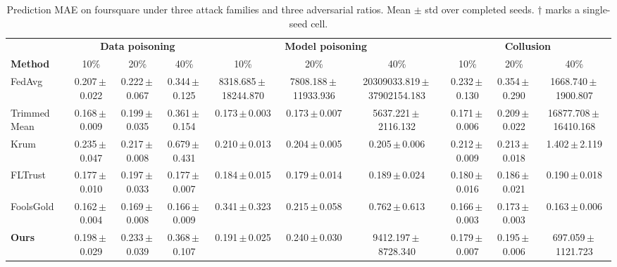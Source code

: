 \begin{table}[t]
\centering
\scriptsize
\caption{Prediction MAE on foursquare under three attack families and three adversarial ratios. Mean $\pm$ std over completed seeds. $\dagger$ marks a single-seed cell.}
\label{tab:main_results}
\begin{tabular}{lccccccccc}
\toprule
& \multicolumn{3}{c}{\textbf{Data poisoning}}& \multicolumn{3}{c}{\textbf{Model poisoning}}& \multicolumn{3}{c}{\textbf{Collusion}} \\
\cmidrule(lr){2-4}\cmidrule(lr){5-7}\cmidrule(lr){8-10}
\textbf{Method} & 10\% & 20\% & 40\% & 10\% & 20\% & 40\% & 10\% & 20\% & 40\% \\
\midrule
FedAvg & 0.207\,$\pm$\,0.022 & 0.222\,$\pm$\,0.067 & 0.344\,$\pm$\,0.125 & 8318.685\,$\pm$\,18244.870 & 7808.188\,$\pm$\,11933.936 & 20309033.819\,$\pm$\,37902154.183 & 0.232\,$\pm$\,0.130 & 0.354\,$\pm$\,0.290 & 1668.740\,$\pm$\,1900.807 \\
Trimmed Mean & 0.168\,$\pm$\,0.009 & 0.199\,$\pm$\,0.035 & 0.361\,$\pm$\,0.154 & 0.173\,$\pm$\,0.003 & 0.173\,$\pm$\,0.007 & 5637.221\,$\pm$\,2116.132 & 0.171\,$\pm$\,0.006 & 0.209\,$\pm$\,0.022 & 16877.708\,$\pm$\,16410.168 \\
Krum & 0.235\,$\pm$\,0.047 & 0.217\,$\pm$\,0.008 & 0.679\,$\pm$\,0.431 & 0.210\,$\pm$\,0.013 & 0.204\,$\pm$\,0.005 & 0.205\,$\pm$\,0.006 & 0.212\,$\pm$\,0.009 & 0.213\,$\pm$\,0.018 & 1.402\,$\pm$\,2.119 \\
FLTrust & 0.177\,$\pm$\,0.010 & 0.197\,$\pm$\,0.033 & 0.177\,$\pm$\,0.007 & 0.184\,$\pm$\,0.015 & 0.179\,$\pm$\,0.014 & 0.189\,$\pm$\,0.024 & 0.180\,$\pm$\,0.016 & 0.186\,$\pm$\,0.021 & 0.190\,$\pm$\,0.018 \\
FoolsGold & 0.162\,$\pm$\,0.004 & 0.169\,$\pm$\,0.008 & 0.166\,$\pm$\,0.009 & 0.341\,$\pm$\,0.323 & 0.215\,$\pm$\,0.058 & 0.762\,$\pm$\,0.613 & 0.166\,$\pm$\,0.003 & 0.173\,$\pm$\,0.003 & 0.163\,$\pm$\,0.006 \\
\textbf{Ours} & 0.198\,$\pm$\,0.029 & 0.233\,$\pm$\,0.039 & 0.368\,$\pm$\,0.107 & 0.191\,$\pm$\,0.025 & 0.240\,$\pm$\,0.030 & 9412.197\,$\pm$\,8728.340 & 0.179\,$\pm$\,0.007 & 0.195\,$\pm$\,0.006 & 697.059\,$\pm$\,1121.723 \\
\bottomrule
\end{tabular}
\end{table}

